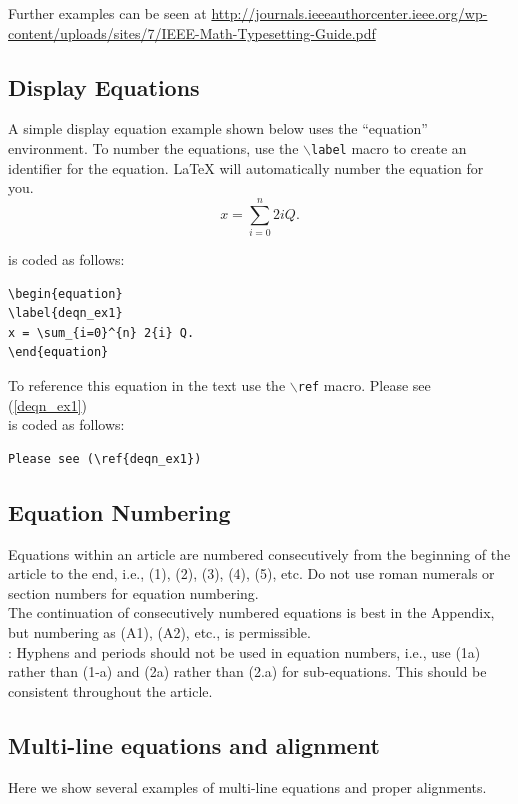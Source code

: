 \documentclass[lettersize,journal]{IEEEtran}
\begin{document}
Further examples can be seen at \url{http://journals.ieeeauthorcenter.ieee.org/wp-content/uploads/sites/7/IEEE-Math-Typesetting-Guide.pdf}

\subsection{Display Equations}
\noindent A simple display equation example shown below uses the ``equation'' environment. To number the equations, use the $\backslash${\tt{label}} macro to create an identifier for the equation. LaTeX will automatically number the equation for you.
\begin{equation}
  \label{deqn_ex1}
  x = \sum_{i=0}^{n} 2{i} Q.
\end{equation}

\noindent is coded as follows:
\begin{verbatim}
\begin{equation}
\label{deqn_ex1}
x = \sum_{i=0}^{n} 2{i} Q.
\end{equation}
\end{verbatim}

To reference this equation in the text use the $\backslash${\tt{ref}} macro.
Please see (\ref{deqn_ex1})\\
\noindent is coded as follows:
\begin{verbatim}
Please see (\ref{deqn_ex1})\end{verbatim}

\subsection{Equation Numbering}
 Equations within an article are numbered consecutively from the beginning of the
article to the end, i.e., (1), (2), (3), (4), (5), etc. Do not use roman numerals or section numbers for equation numbering.\\

 The continuation of consecutively numbered equations is best in the Appendix, but numbering
as (A1), (A2), etc., is permissible.\\

: Hyphens and periods should not be used in equation numbers, i.e., use (1a) rather than
(1-a) and (2a) rather than (2.a) for sub-equations. This should be consistent throughout the article.

\subsection{Multi-line equations and alignment}
\noindent Here we show several examples of multi-line equations and proper alignments.
\end{document}
